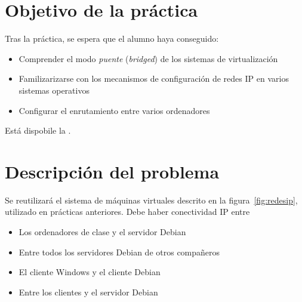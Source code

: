 
\usepackage{eurosym}
\usepackage{needspace}




\renewcommand{\hmwkTitle}{Práctica enrutamiento IP}
\renewcommand{\hmwkClass}{Planificación y Administración de Redes}

\usepackage{blindtext}






\primerapagina

\setlength{\parindent}{1em}
\setlength{\parskip}{1em}

\section{Objetivo de la práctica}
Tras la práctica, se espera que el alumno haya conseguido:
\begin{itemize}
\item Comprender el modo \textit{puente} (\textit{bridged}) de los sistemas de virtualización
\item Familizarizarse con los  mecanismos de configuración de redes IP en varios sistemas operativos
\item Configurar el enrutamiento entre varios ordenadores
\end{itemize}

Está dispobile la .



\section{Descripción del problema}
Se reutilizará el sistema de máquinas virtuales descrito en la figura~\ref{fig:redesip}, utilizado en prácticas anteriores. Debe haber conectividad IP entre
\begin{itemize}
\item Los ordenadores de clase y el servidor Debian
\item Entre todos los servidores Debian de otros compañeros
\item El cliente Windows y el cliente Debian
\item Entre los clientes y el servidor Debian
\end{itemize}

